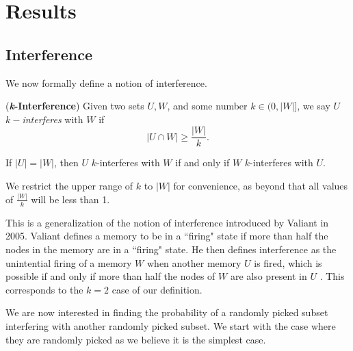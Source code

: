 \chapter{Results}

\section{Interference}

We now formally define a notion of interference. 

\begin{definition}
    (\textbf{\textit{k}-Interference}) Given two sets $U, W$, and some number $k \in (0,|W|]$, we say $U$ $k-$\textit{interferes} with $W$ if 
    \begin{equation}
        |U \cap W| \ge  \frac{|W|}{k}.
    \end{equation}
\end{definition}

\begin{corollary}
    \label{collorary:k-int-equals}
        If $|U| = |W|$, then $U$ $k$-interferes with $W$ if and only if $W$ $k$-interferes with $U$.
    \end{corollary}
    
We restrict the upper range of $k$ to $|W|$ for convenience, as beyond that all values of $\frac{|W|}{k}$ will be less than 1.

This is a generalization of the notion of interference introduced by Valiant in 2005. Valiant defines a memory to be in a ``firing" state if more than half the nodes in the memory are in a ``firing" state. He then defines interference as the unintential firing of a memory $W$ when another memory $U$ is fired, which is possible if and only if more than half the nodes of $W$ are also present in $U$ \cite{valiant2005memorization}. This corresponds to the $k = 2$ case of our definition. 

We are now interested in finding the probability of a randomly picked subset interfering with another randomly picked subset. We start with the case where they are randomly picked as we believe it is the simplest case. 

